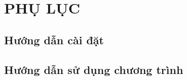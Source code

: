 
\newpage

\section*{PHỤ LỤC}
\setcounter{subsection}{0}
\renewcommand{\thesubsection}{\arabic{subsection}.} %

\subsection{Hướng dẫn cài đặt}
\subsection{Hướng dẫn sử dụng chương trình}